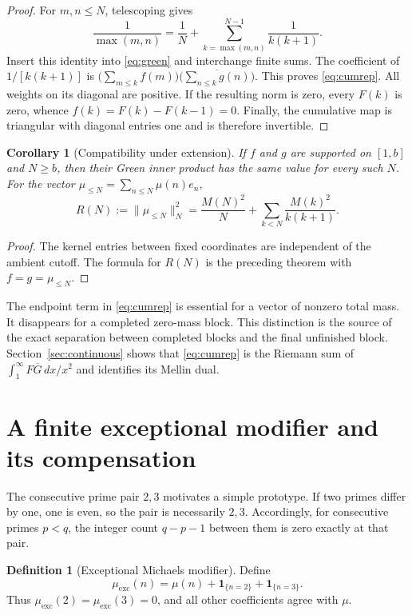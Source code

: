\documentclass[11pt]{article}
\newtheorem{corollary}[theorem]{Corollary}
\theoremstyle{definition}
\newtheorem{definition}[theorem]{Definition}
\theoremstyle{remark}
\begin{document}
\begin{proof}
For $m,n\le N$, telescoping gives
\[
\frac{1}{\max(m,n)}=\frac1N+\sum_{k=\max(m,n)}^{N-1}\frac{1}{k(k+1)}.
\]
Insert this identity into \eqref{eq:green} and interchange finite sums. The coefficient of $1/[k(k+1)]$ is $\big(\sum_{m\le k}f(m)\big)\big(\overline{\sum_{n\le k}g(n)}\big)$. This proves \eqref{eq:cumrep}. All weights on its diagonal are positive. If the resulting norm is zero, every $F(k)$ is zero, whence $f(k)=F(k)-F(k-1)=0$. Finally, the cumulative map is triangular with diagonal entries one and is therefore invertible.
\end{proof}

\begin{corollary}[Compatibility under extension]\label{cor:extension}
If $f$ and $g$ are supported on $[1,b]$ and $N\ge b$, then their Green inner product has the same value for every such $N$. For the vector $\mu_{\le N}=\sum_{n\le N}\mu(n)e_n$,
\begin{equation}\label{eq:RN}
R(N):=\|\mu_{\le N}\|_N^2=\frac{M(N)^2}{N}+\sum_{k<N}\frac{M(k)^2}{k(k+1)}.
\end{equation}
\end{corollary}

\begin{proof}
The kernel entries between fixed coordinates are independent of the ambient cutoff. The formula for $R(N)$ is the preceding theorem with $f=g=\mu_{\le N}$.
\end{proof}

The endpoint term in \eqref{eq:cumrep} is essential for a vector of nonzero total mass. It disappears for a completed zero-mass block. This distinction is the source of the exact separation between completed blocks and the final unfinished block. Section~\ref{sec:continuous} shows that \eqref{eq:cumrep} is the Riemann sum of $\int_1^\infty F\overline{G}\,dx/x^2$ and identifies its Mellin dual.

\section{A finite exceptional modifier and its compensation}\label{sec:exceptional}

The consecutive prime pair $2,3$ motivates a simple prototype. If two primes differ by one, one is even, so the pair is necessarily $2,3$. Accordingly, for consecutive primes $p<q$, the integer count $q-p-1$ between them is zero exactly at that pair.

\begin{definition}[Exceptional Michaels modifier]
Define
\begin{equation}
\mu_{\mathrm{exc}}(n)=\mu(n)+\mathbf 1_{\{n=2\}}+\mathbf 1_{\{n=3\}}.
\end{equation}
Thus $\mu_{\mathrm{exc}}(2)=\mu_{\mathrm{exc}}(3)=0$, and all other coefficients agree with $\mu$.
\end{definition}
\end{document}
